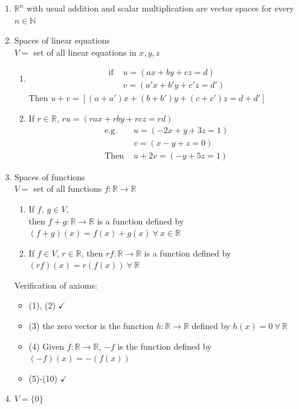 \documentclass[]{article}
\begin{document}
		\begin{enumerate}
			\item $\mathbb{R}^n$ with usual addition and scalar multiplication are vector spaces for every $n\in\mathbb{N}$\\
			\item Spaces of linear equations\\
			$V=$ set of all linear equations in  $x,y,z$
			\begin{enumerate}
				\item\begin{align*}
					\text{if }&u=(ax+by+cz=d)\\
					&v=(a'x+b'y+c'z=d')
				\end{align*}
				Then $u+v=\left[(a+a')x+(b+b')y+(c+c')z=d+d'\right]$
				\item If $r\in\mathbb{R}$, $ru=(rax+rby+rcz=rd)$
				\begin{align*}
					\text{e.g. }&u=(-2x+y+3z=1)\\
					&v=(x-y+z=0)\\
					\text{Then }&u+2v=(-y+5z=1)
				\end{align*}
			\end{enumerate}
			\item Spaces of functions\\
			$V=$ set of all functions $f:\mathbb{R}\rightarrow\mathbb{R}$
			\begin{enumerate}
				\item If $f,~g\in V$,\\
				then $f+g:\mathbb{R}\rightarrow\mathbb{R}$ is a function defined by $(f+g)(x)=f(x)+g(x)~\forall~x\in\mathbb{R}$
				\item If $f\in V$, $r\in\mathbb{R}$, then $rf:\mathbb{R}\rightarrow\mathbb{R}$ is a function defined by $(rf)(x)=r(f(x))~\forall~\mathbb{R}$
			\end{enumerate}
			Verification of axioms:
			\begin{itemize}
				\item (1), (2) $\checkmark$
				\item (3) the zero vector is the function $h:\mathbb{R}\rightarrow\mathbb{R}$ defined by $h(x)=0~\forall~\mathbb{R}$
				\item (4) Given $f:\mathbb{R}\rightarrow\mathbb{R}$, $-f$ is the function defined by $(-f)(x)=-(f(x))$
				\item (5)-(10) $\checkmark$
			\end{itemize}
			\item $V=\{0\}$
			\begin{enumerate}

\end{enumerate}
\end{enumerate}
\end{document}
